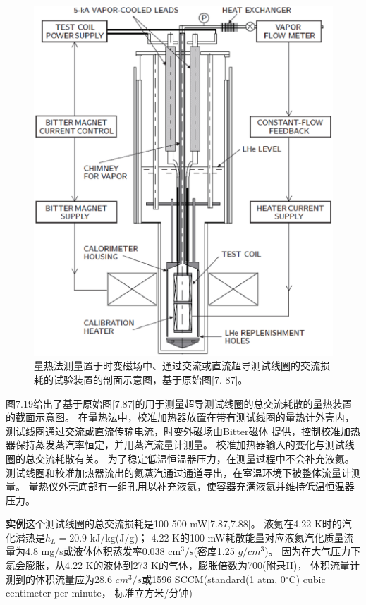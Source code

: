 \begin{figure}[htbp]
	\centering
	\includegraphics[scale=0.7]{chpt7/figs/fig7.19.eps}
	\caption{量热法测量置于时变磁场中、通过交流或直流超导测试线圈的交流损耗的试验装置的剖面示意图，基于原始图[7.
		87]。}
\end{figure}

图7.19给出了基于原始图[7.87]的用于测量超导测试线圈的总交流耗散的量热装置的截面示意图。
在量热法中，校准加热器放置在带有测试线圈的量热计外壳内，测试线圈通过交流或直流传输电流，时变外磁场由Bitter磁体
提供，控制校准加热器保持蒸发蒸汽率恒定，并用蒸汽流量计测量。
校准加热器输入的变化与测试线圈的总交流耗散有关。
为了稳定低温恒温器压力，在测量过程中不会补充液氦。
测试线圈和校准加热器流出的氦蒸汽通过通道导出，在室温环境下被整体流量计测量。
量热仪外壳底部有一组孔用以补充液氦，使容器充满液氦并维持低温恒温器压力。

\textbf{实例}\quad 这个测试线圈的总交流损耗是100-500 mW[7.87,7.88]。
液氦在4.22 K时的汽化潜热是$h_L=20.9$ kJ/kg(J/g)；
4.22 K的100 mW耗散能量对应液氦汽化质量流量为4.8 mg/s或液体体积蒸发率0.038 $\mathrm{cm^3/s}$(密度1.25 $g/cm^3$)。
因为在大气压力下氦会膨胀，从4.22 K的液体到273 K的气体，膨胀倍数为700(附录II)，
体积流量计测到的体积流量应为28.6 $cm^3/s$或1596 SCCM(standard(1 atm, 0$^\circ$C) cubic centimeter per minute， 标准立方米/分钟)

